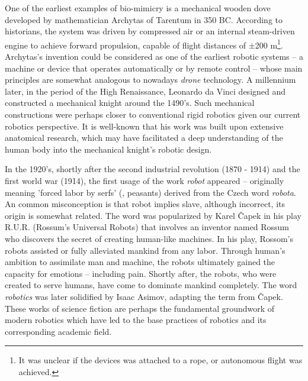 One of the earliest examples of bio-mimicry is a mechanical wooden dove developed by mathematician Archytas of Tarentum in 350 BC. According to historians, the system was driven by compressed air or an internal steam-driven engine to achieve forward propulsion, capable of flight distances of $\pm$200 \si{\meter}\footnote{It was unclear if the devices was attached to a rope, or autonomous flight was achieved.}. Archytas's invention could be considered as one of the earliest robotic systems -- a machine or device that operates automatically or by remote control -- whose main principles are somewhat analogous to nowadays \emph{drone} technology.  A millennium later, in the period of the High Renaissance, Leonardo da Vinci designed and constructed a mechanical knight around the 1490's. Such mechanical constructions were perhaps closer to conventional rigid robotics given our current robotics perspective. It is well-known that his work was built upon extensive anatomical research, which may have facilitated a deep understanding of the human body into the mechanical knight's robotic design.

\par In the 1920's, shortly after the second industrial revolution (1870 - 1914) and the first world war (1914), the first usage of the work \emph{robot} appeared -- originally meaning 'forced labor by serfs' (\ie, peasants) derived from the Czech word \emph{robota}. An common misconception is that robot implies slave, although incorrect, its origin is somewhat related. The word was popularized by Karel \v{C}apek in his play R.U.R. (Rossum’s Universal Robots) that involves an inventor named Rossum who discovers the secret of creating human-like machines. In his play, Rossom's robots assisted or fully alleviated mankind from any labor. Through human's ambition to assimilate man and machine, the robots ultimately gained the capacity for emotions -- including pain. Shortly after, the robots, who were created to serve humans, have come to dominate mankind completely. The word \emph{robotics} was later solidified by Isaac Asimov, adapting the term from \v{C}apek. These works of science fiction are perhaps the fundamental groundwork of modern robotics which have led to the base practices of robotics and its corresponding academic field.

